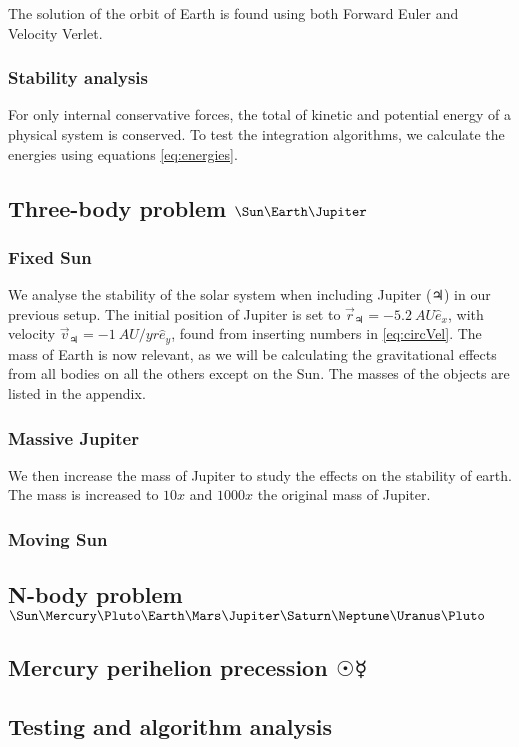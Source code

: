 \documentclass[10pt]{article}
\begin{document}
\begin{multicols}{2}
The solution of the orbit of Earth is found using both Forward Euler and
Velocity Verlet. 

\subsubsection{Stability analysis}
For only internal conservative forces, the total of kinetic and potential
energy of a physical system is conserved.  To test the integration algorithms, 
we calculate the energies using equations \cref{eq:energies}.

\subsection{Three-body problem \texorpdfstring{$\Sun\Earth\Jupiter$}{}} 
\subsubsection{Fixed Sun }
We analyse the stability of the solar system when including Jupiter
($\Jupiter$) in our previous setup. The initial position of Jupiter is set to
$\vec r_\Jupiter = -\SI{5.2}{AU}\hat e_x$, with velocity $\vec v_\Jupiter =
-\SI{1}{AU/yr}\hat e_y$, found from inserting numbers in \cref{eq:circVel}.
The mass of Earth is now relevant, as we will be calculating the
gravitational effects from all bodies on all the others except on the Sun.
The masses of the objects are listed in the appendix.

\subsubsection{Massive Jupiter }
We then increase the mass of Jupiter to study the effects on the stability
of earth. The mass is increased to $10x$ and $1000x$ the original mass of
Jupiter.
\subsubsection{Moving Sun }
\subsection{N-body problem \texorpdfstring{$\Sun\Mercury\Pluto\Earth\Mars\Jupiter\Saturn\Neptune\Uranus\Pluto$}{}} 
\subsection{Mercury perihelion precession \texorpdfstring{$\Sun\Mercury$}{}} 
\subsection{Testing and algorithm analysis}

\end{multicols}
\end{document}
